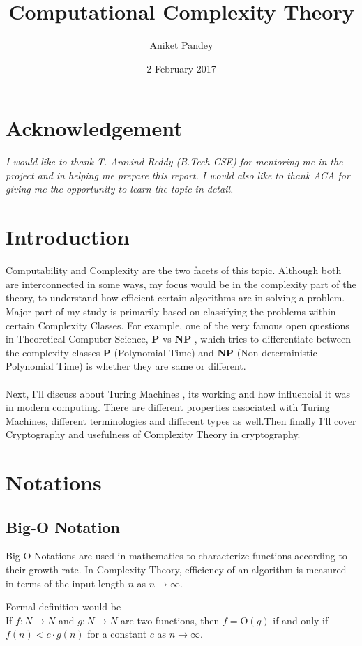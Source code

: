 \documentclass[12pt,a4paper]{extarticle}
\title{\textbf{Computational Complexity Theory}}
\date{2 February 2017}
\author{Aniket Pandey}
\begin{document}
\maketitle

\section{Acknowledgement}
\textit{I would like to thank T. Aravind Reddy (B.Tech CSE) for mentoring me in the project and in helping me prepare this report. I would also like to thank ACA for giving me the opportunity to learn the topic in detail.}

\section{Introduction}
Computability and Complexity are the two facets of this topic. Although both are interconnected in some ways, my focus would be in the complexity part of the theory, to understand how efficient certain algorithms are in solving a problem. Major part of my study is primarily based on classifying the problems within certain Complexity Classes. 
For example, one of the very famous open questions in Theoretical Computer Science, \textbf{P} vs \textbf{NP} , which tries to differentiate between the complexity classes \textbf{P} (Polynomial Time) and \textbf{NP} (Non-deterministic Polynomial Time) is whether they are same or different.\\\\Next, I'll discuss about Turing Machines , its working and how influencial it was in modern computing. There are different properties associated with Turing Machines, different terminologies and different types as well.Then finally I'll cover Cryptography and usefulness of Complexity Theory in cryptography. 

\section{Notations}
\subsection{Big-O Notation}
Big-O Notations are used in mathematics to characterize functions according to their growth rate. In Complexity Theory, efficiency of an algorithm is measured in terms of the input length $n$ as $n\rightarrow \infty $.\par Formal definition would be\\If $f:N\rightarrow N$ and $g:N\rightarrow N$ are two functions, then $f=$O$(g)$ if and only if $f(n)<c \cdot g(n)$ for a constant $c$ as $n\rightarrow\infty$.
\newpage
\end{document}

